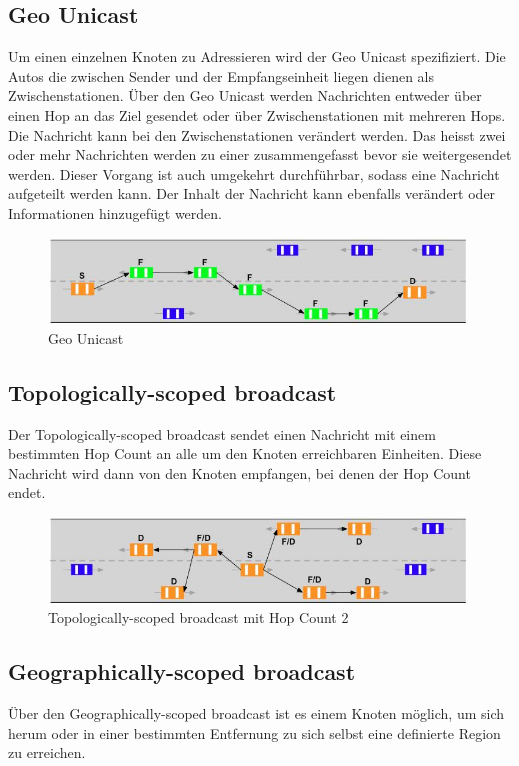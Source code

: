 \subsection{Geo Unicast}
Um einen einzelnen Knoten zu Adressieren wird der Geo Unicast spezifiziert. Die Autos die zwischen Sender und der Empfangseinheit liegen dienen als Zwischenstationen. Über den Geo Unicast werden Nachrichten entweder über einen Hop an das Ziel gesendet oder über Zwischenstationen mit mehreren Hops. Die Nachricht kann bei den Zwischenstationen verändert werden. Das heisst zwei oder mehr Nachrichten werden zu einer zusammengefasst bevor sie weitergesendet werden. Dieser Vorgang ist auch umgekehrt durchführbar, sodass eine Nachricht aufgeteilt werden kann. Der Inhalt der Nachricht kann ebenfalls verändert oder Informationen hinzugefügt werden. 

\begin{figure}
\includegraphics[width=0.99\textwidth]{content/images/03_networklayer/GeoUnicast.jpg}
\caption{Geo Unicast \cite{etsi102636-1}}
\label{fig:geounicast}
\end{figure}

\subsection{Topologically-scoped broadcast}
Der Topologically-scoped broadcast sendet einen Nachricht mit einem bestimmten Hop Count an alle um den Knoten erreichbaren Einheiten. Diese Nachricht wird dann von den Knoten empfangen, bei denen der Hop Count endet.

\begin{figure}
\includegraphics[width=0.99\textwidth]{content/images/03_networklayer/TSC.jpg}
\caption{Topologically-scoped broadcast mit Hop Count 2 \cite{etsi102636-1}}
\label{fig:tsc}
\end{figure}


\subsection{Geographically-scoped broadcast}
Über den Geographically-scoped broadcast ist es einem Knoten möglich, um sich herum oder in einer bestimmten Entfernung zu sich selbst eine definierte Region zu erreichen. 

